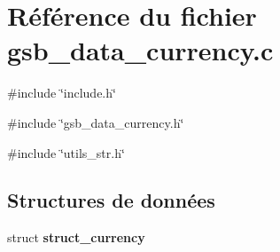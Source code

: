 \section{Référence du fichier gsb\_\-data\_\-currency.c}
\label{gsb__data__currency_8c}
{\ttfamily \#include \char`\"{}include.h\char`\"{}}\par
{\ttfamily \#include \char`\"{}gsb\_\-data\_\-currency.h\char`\"{}}\par
{\ttfamily \#include \char`\"{}utils\_\-str.h\char`\"{}}\par
\subsection*{Structures de données}
\begin{DoxyCompactItemize}
\item 
struct {\bf struct\_\-currency}
\end{DoxyCompactItemize}
